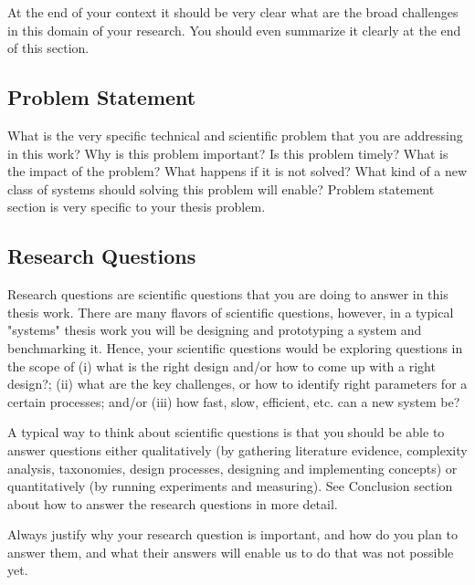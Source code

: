 \documentclass[11pt]{article}
\begin{document}
At the end of your context it should be very clear what are the broad challenges in this domain of your research. You should even summarize it clearly at the end of this section. 

\subsection{Problem Statement}
What is the very specific technical and scientific problem that you are addressing in this work? Why is this problem important? Is this problem timely? What is the impact of the problem? What happens if it is not solved? What kind of a new class of systems should solving this problem will enable? Problem statement section is very specific to your thesis problem. 

\subsection{Research Questions}

Research questions are scientific questions that you are doing to answer in this thesis work. There are many flavors of scientific questions, however, in a typical "systems" thesis work you will be designing and prototyping a system and benchmarking it. Hence, your scientific questions would be exploring questions in the scope of (i) what is the right design and/or how to come up with a right design?; (ii) what are the key challenges, or how to identify right parameters for a certain processes; and/or (iii) how fast, slow, efficient, etc. can a new system be? 

A typical way to think about scientific questions is that you should be able to answer questions either qualitatively (by gathering literature evidence, complexity analysis, taxonomies, design processes, designing and implementing concepts) or quantitatively (by running experiments and measuring). See Conclusion section about how to answer the research questions in more detail. 

Always justify why your research question is important, and how do you plan to answer them, and what their answers will enable us to do that was not possible yet.  
\end{document}
